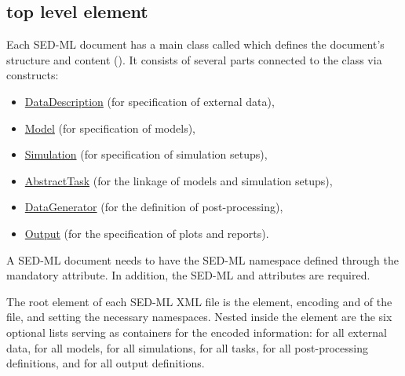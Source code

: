 \subsection{ top level element}
\label{class:sed-ml}
Each SED-ML \currentLV document has a main class called  which defines the document's structure and content (). It consists of several parts connected to the  class via \hyperref[sec:listOf]{} constructs: 
\begin{itemize}
	\item \hyperref[class:dataDescription]{DataDescription} (for specification of external data), 
	\item \hyperref[class:model]{Model} (for specification of models),
	\item \hyperref[class:simulation]{Simulation} (for specification of simulation setups), 
	\item \hyperref[class:abstractTask]{AbstractTask} (for the linkage of models and simulation setups), 
	\item \hyperref[class:dataGenerator]{DataGenerator} (for the definition of post-processing),
	\item \hyperref[class:output]{Output} (for the specification of plots and reports).
\end{itemize}

A SED-ML document needs to have the SED-ML namespace defined through the mandatory \hyperref[sec:xmlns]{} attribute. In addition, the SED-ML \hyperref[sec:level]{} and \hyperref[sec:version]{} attributes are required.

The root element of each SED-ML XML file is the  element, encoding \hyperref[sec:level]{} and \hyperref[sec:version]{} of the file, and setting the necessary namespaces. Nested inside the  element are the six optional lists serving as containers for the encoded information: \hyperref[sec:listOfDataDescriptions]{} for all external data, \hyperref[sec:listOfModels]{} for all models, \hyperref[sec:listOfSimulations]{} for all simulations, \hyperref[sec:listOfTasks]{} for all tasks, \hyperref[sec:listOfDataGenerators]{} for all post-processing definitions, and \hyperref[sec:listOfOutputs]{} for all output definitions.

